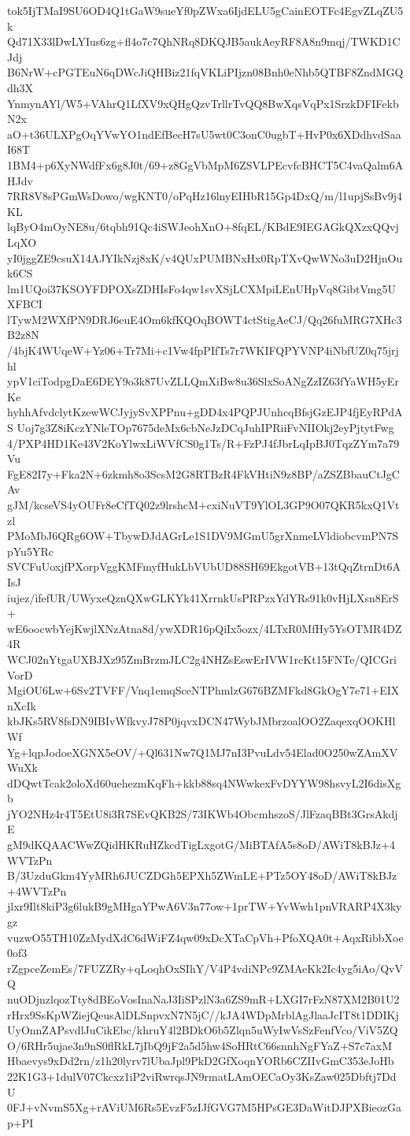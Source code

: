 tok5IjTMaI9SU6OD4Q1tGaW9sueYf0pZWxa6IjdELU5gCainEOTFc4EgvZLqZU5k
Qd71X33lDwLYIus6zg+fl4o7c7QhNRq8DKQJB5aukAeyRF8A8n9mqj/TWKD1CJdj
B6NrW+cPGTEuN6qDWcJiQHBiz21fqVKLiPIjzn08Bnh0eNhb5QTBF8ZndMGQdh3X
YnmynAYl/W5+VAhrQ1LfXV9xQHgQzvTrllrTvQQ8BwXqsVqPx1SrzkDFIFekbN2x
aO+t36ULXPgOqYVwYO1ndEfBecH7sU5wt0C3onC0ugbT+HvP0x6XDdhvdSaaI68T
1BM4+p6XyNWdfFx6g8J0t/69+z8GgVbMpM6ZSVLPEcvfcBHCT5C4vaQalm6AHJdv
7RR8V8sPGmWsDowo/wgKNT0/oPqHz16lnyEIHbR15Gp4DxQ/m/l1upjSsBv9j4KL
lqByO4mOyNE8u/6tqbh91Qc4iSWJeohXnO+8fqEL/KBdE9IEGAGkQXzxQQvjLqXO
yI0jggZE9csuX14AJYIkNzj8xK/v4QUxPUMBNxHx0RpTXvQwWNo3uD2HjnOuk6CS
lm1UQoi37KSOYFDPOXsZDHIsFo4qw1svXSjLCXMpiLEnUHpVq8GibtVmg5UXFBCI
lTywM2WXfPN9DRJ6euE4Om6kfKQOqBOWT4ctStigAeCJ/Qq26fuMRG7XHc3B2z8N
/4bjK4WUqeW+Yz06+Tr7Mi+c1Vw4fpPIfTs7r7WKIFQPYVNP4iNbfUZ0q75jrjhl
ypV1ciTodpgDaE6DEY9o3k87UvZLLQmXiBw8u36SlxSoANgZzIZ63fYaWH5yErKe
hyhhAfvdclytKzewWCJyjySvXPPnu+gDD4x4PQPJUnhcqBfsjGzEJP4fjEyRPdAS
Uoj7g3Z8iKczYNleTOp7675deMx6cbNeJzDCqJuhIPRiiFvNIIOkj2eyPjtytFwg
4/PXP4HD1Ke43V2KoYlwxLiWVfCS0g1Ts/R+FzPJ4fJbrLqIpBJ0TqzZYm7a79Vu
FgE82I7y+Fka2N+6zkmh8o3ScsM2G8RTBzR4FkVHtiN9z8BP/aZSZBbauCtJgCAv
gJM/kcseVS4yOUFr8eCfTQ02z9lrshcM+cxiNuVT9YlOL3GP9O07QKR5kxQ1Vtzl
PMoMbJ6QRg6OW+TbywDJdAGrLe1S1DV9MGmU5grXnmeLVldiobcvmPN7SpYu5YRc
SVCFuUoxjfPXorpVggKMFmyfHukLbVUbUD88SH69EkgotVB+13tQqZtrnDt6AIsJ
iujez/ifefUR/UWyxeQznQXwGLKYk41XrrnkUsPRPzxYdYRs91k0vHjLXsn8ErS+
wE6oocwbYejKwjlXNzAtna8d/ywXDR16pQiIx5ozx/4LTxR0MfHy5YsOTMR4DZ4R
WCJ02nYtgaUXBJXz95ZmBrzmJLC2g4NHZsEswErIVW1rcKt15FNTe/QICGriVorD
MgiOU6Lw+6Sv2TVFF/Vnq1emqSceNTPhmlzG676BZMFkd8GkOgY7e71+EIXnXcIk
kbJKs5RV8fsDN9IBIvWfkvyJ78P0jqvxDCN47WybJMbrzoalOO2ZaqexqOOKHlWf
Yg+lqpJodoeXGNX5eOV/+Ql631Nw7Q1MJ7nI3PvuLdv54Elad0O250wZAmXVWuXk
dDQwtTcak2oloXd60uehezmKqFh+kkb88sq4NWwkexFvDYYW98hsvyL2I6disXgb
jYO2NHz4r4T5EtU8i3R7SEvQKB2S/73IKWb4ObcmhszoS/JlFzaqBBt3GrsAkdjE
gM9dKQAACWwZQidHKRuHZkcdTigLxgotG/MiBTAfA5s8oD/AWiT8kBJz+4WVTzPn
B/3UzduGkm4YyMRh6JUCZDGh5EPXh5ZWmLE+PTz5OY48oD/AWiT8kBJz+4WVTzPn
jlxr9Ilt8kiP3g6lukB9gMHgaYPwA6V3n77ow+1prTW+YvWwh1pnVRARP4X3kygz
vuzwO55TH10ZzMydXdC6dWiFZ4qw09xDcXTaCpVh+PfoXQA0t+AqxRibbXoe0of3
rZgpceZemEs/7FUZZRy+qLoqhOxSIhY/V4P4vdiNPc9ZMAeKk2Ic4yg5iAo/QvVQ
nuODjnzlqozTty8dBEoVosInaNaJ3IiSPzlN3a6ZS9mR+LXGI7rFzN87XM2B01U2
rHrx9SsKpWZiejQeusAlDLSnpvxN7N5jC//kJA4WDpMrblAgJlaaJcIT8t1DDIKj
UyOnnZAPsvdlJuCikEbc/khruY4l2BDkO6b5Zlqn5uWyIwVsSzFenfVco/ViV5ZQ
O/6RHr5ujae3n9nS0flRkL7jIbQ9jF2a5d5hw4SoHRtC66snnhNgFYaZ+S7c7axM
Hbaevys9xDd2rn/z1h20lyrv7lUbaJpl9PkD2GfXoqnYORb6CZIIvGmC353eJoHb
22K1G3+1dulV07Ckcxz1iP2viRwrqsJN9rmatLAmOECaOy3KsZaw025Dbftj7DdU
0FJ+vNvmS5Xg+rAViUM6Rs5EvzF5zIJfGVG7M5HPsGE3DaWitDJPXBieozGap+PI
